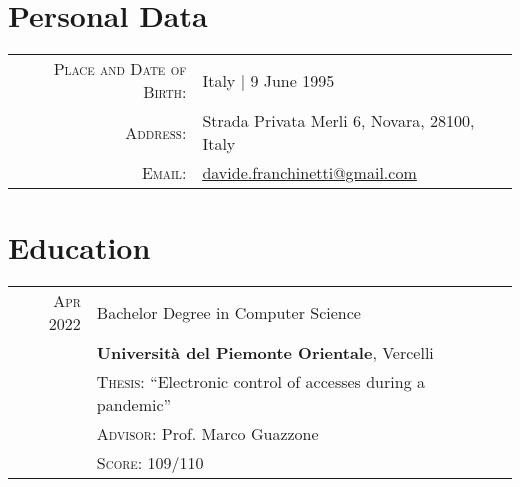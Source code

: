 \documentclass[a4paper,10pt]{article} %
\begin{document}
\pagestyle{empty} %


\par{\bigskip\par} %

\section{Personal Data}

\begin{tabular}{rl}
\textsc{Place and Date of Birth:} & Italy | 9 June 1995 \\
\textsc{Address:} & Strada Privata Merli 6, Novara, 28100, Italy \\
\textsc{Email:} & \href{mailto:davide.franchinetti@gmail.com}{\underline{davide.franchinetti@gmail.com}}\\
\end{tabular}


\section{Education}

\begin{tabular}{rl}	
\textsc{Apr 2022} & Bachelor Degree in Computer Science\\
& \textbf{Università del Piemonte Orientale}, Vercelli\\
& \textsc{Thesis:} ``Electronic control of accesses during a pandemic''\\
& \small \textsc{Advisor:} Prof. Marco Guazzone\\
& \normalsize \textsc{Score:} 109/110\\
\end{tabular}
\end{document}
